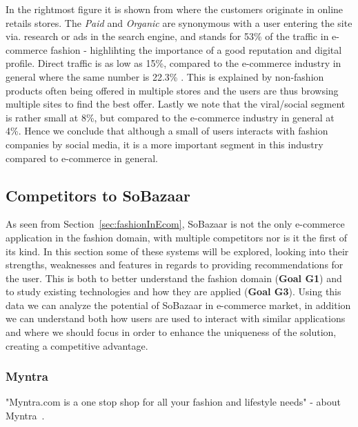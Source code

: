 In the rightmost figure it is shown from where the customers originate in
online retails stores. The \textit{Paid} and \textit{Organic} are synonymous
with a user entering the site via. research or ads in the search engine, and
stands for 53\% of the traffic in e-commerce fashion - highlihting the
importance of a good reputation and digital profile. Direct traffic is as low
as 15\%, compared to the e-commerce industry in general where the same number
is 22.3\% \cite{Jorij2012}. This is explained by non-fashion products often
being offered in multiple stores and the users are thus browsing multiple
sites to find the best offer. Lastly we note that the viral/social segment is
rather small at 8\%, but compared to the e-commerce industry in general at
4\%. Hence we conclude that although a small of users interacts with fashion
companies by social media, it is a more important segment in this industry
compared to e-commerce in general.

\subsection{Competitors to SoBazaar}
\label{subsec:competitors}


As seen from Section~\ref{sec:fashionInEcom}, SoBazaar is not the only
e-commerce application in the fashion domain, with multiple competitors nor is
it the first of its kind. In this section some of these systems will be
explored, looking into their strengths, weaknesses and features in regards to
providing recommendations for the user. This is both to better understand the
fashion domain (\textbf{Goal G1}) and to study existing technologies and how
they are applied (\textbf{Goal G3}). Using this data we can analyze the
potential of SoBazaar in e-commerce market, in addition we can understand both
how users are used to interact with similar applications and where we should
focus in order to enhance the uniqueness of the solution, creating a
competitive advantage.

\subsubsection{Myntra}
\label{par:myntra}

"Myntra.com is a one stop shop for all your fashion and lifestyle needs" -
about Myntra~\cite{myntra}.

